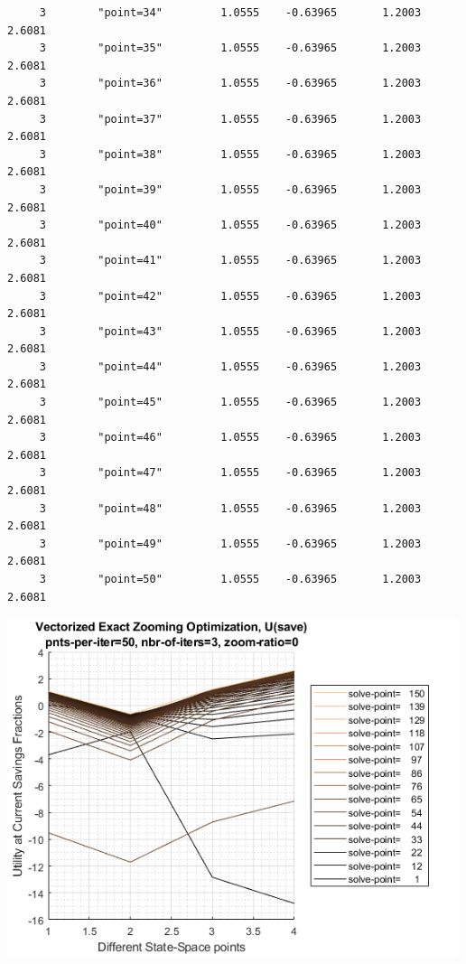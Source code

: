 \documentclass[
]{book}
\begin{document}
\begin{verbatim}
     3        "point=34"         1.0555    -0.63965       1.2003      2.6081
     3        "point=35"         1.0555    -0.63965       1.2003      2.6081
     3        "point=36"         1.0555    -0.63965       1.2003      2.6081
     3        "point=37"         1.0555    -0.63965       1.2003      2.6081
     3        "point=38"         1.0555    -0.63965       1.2003      2.6081
     3        "point=39"         1.0555    -0.63965       1.2003      2.6081
     3        "point=40"         1.0555    -0.63965       1.2003      2.6081
     3        "point=41"         1.0555    -0.63965       1.2003      2.6081
     3        "point=42"         1.0555    -0.63965       1.2003      2.6081
     3        "point=43"         1.0555    -0.63965       1.2003      2.6081
     3        "point=44"         1.0555    -0.63965       1.2003      2.6081
     3        "point=45"         1.0555    -0.63965       1.2003      2.6081
     3        "point=46"         1.0555    -0.63965       1.2003      2.6081
     3        "point=47"         1.0555    -0.63965       1.2003      2.6081
     3        "point=48"         1.0555    -0.63965       1.2003      2.6081
     3        "point=49"         1.0555    -0.63965       1.2003      2.6081
     3        "point=50"         1.0555    -0.63965       1.2003      2.6081
\end{verbatim}

\includegraphics[width=5.20833in,height=\textheight]{img/fx_optim_mzoom_savezrone_images/figure_1.png}
\end{document}
